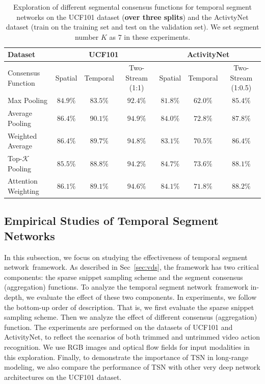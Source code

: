 \documentclass[10pt,journal,compsoc]{IEEEtran}
\newcommand{\SEGNET}{temporal segment network}
\begin{document}
\begin{table}[t]
  \begin{center}
    \caption{Exploration of different segmental consensus functions for \SEGNET s on the UCF101 dataset ({\bf over three splits}) and the ActivtyNet dataset (train on the training set and test on the validation set). We set segment number $K$ as 7 in these experiments.}
    \label{tbl:segmental}
    \vspace{-10pt}
    \begin{tabular}{|l|ccc|ccc|}
    \hline
     Dataset &\multicolumn{3}{|c|}{UCF101} & \multicolumn{3}{|c|}{ActivityNet}   \\
      \hline
      Consensus Function & Spatial& Temporal  & Two-Stream (1:1) & Spatial   & Temporal  & Two-Stream (1:0.5) \\
      \hline 
      Max Pooling & $ 84.9\%  $& $ 83.5\% $ & $ 92.4\% $ & $81.8\%$& $ 62.0\%$ & $ 85.4\% $ \\
      \hline
      Average Pooling  &  $ 86.4\% $ &  $ 90.1\% $ & $ \mathbf{94.9\%} $ & $84.0\%  $& $ 72.8\% $ & $ 87.8\% $ \\
      \hline
      Weighted Average & $ 86.4\% $ & $ 89.7\% $ & $ 94.8\% $ & $83.1\%$ & $ 70.5\%$ & $ 86.4\% $ \\
      \hline
      \hline
      Top-$\mathcal{K}$ Pooling &  $85.5\%$&  $88.8\%$ & $94.2\%$ & $ 84.7 \% $ & $ 73.6\% $ & $ 88.1\% $ \\
      \hline
      Attention Weighting & $86.1\%$ & $89.1\%$ &  $94.6\%$ & $ 84.1\% $   & $ 71.8\% $ & $ \mathbf{88.2}\% $ \\
      \hline
    \end{tabular}
  \end{center}
  \vspace{-15pt}
\end{table}


\subsection{Empirical Studies of Temporal Segment Networks}

In this subsection, we focus on studying the effectiveness of \SEGNET~framework. 
As described in Sec~\ref{sec:vds}, the framework has two critical components: the sparse snippet sampling scheme and the segment consensus (aggregation) functions. 
To analyze the \SEGNET~framework in-depth, we evaluate the effect of these two components.
In experiments, we follow the bottom-up order of description. 
That is, we first evaluate the sparse snippet sampling scheme. Then we analyze the effect of different consensus (aggregation) function.
The experiments are performed on the datasets of UCF101 and ActivityNet, to reflect the scenarios of both trimmed and untrimmed video action recognition.
We use RGB images and optical flow fields for input modalities in this exploration. 
Finally, to demonstrate the importance of TSN in long-range modeling, we also compare the performance of TSN with other very deep network architectures on the UCF101 dataset.
\end{document}
